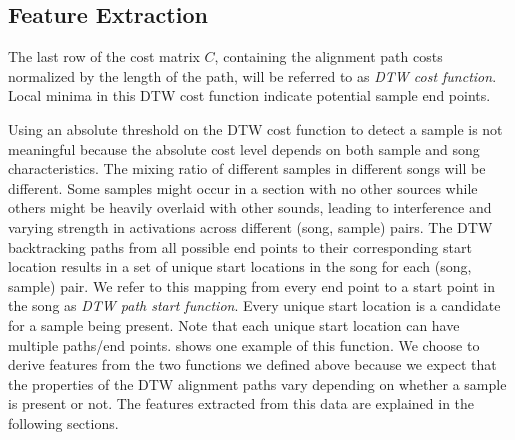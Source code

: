 \documentclass{article}
\begin{document}
\subsection{Feature Extraction}
The last row of the cost matrix $C$, containing the alignment path costs normalized by the length of the path, will be referred to as \textit{DTW cost function}. Local minima in this DTW cost function indicate potential sample end points.

Using an absolute threshold on the DTW cost function to detect a sample is not meaningful because the absolute cost level depends on both sample and song characteristics. The mixing ratio of different samples in different songs will be different. Some samples might occur in a section with no other sources while others might be heavily overlaid with other sounds, leading to interference and varying strength in activations across different (song, sample) pairs. The DTW backtracking paths from all possible end points to their corresponding start location results in a set of unique start locations in the song for each (song, sample) pair. We refer to this mapping from every end point to a start point in the song as \textit{DTW path start function}. Every unique start location is a candidate for a sample being present. Note that each unique start location can have multiple paths/end points.  shows one example of this function.
We choose to derive features from the two functions we defined above because we expect that the properties of the DTW alignment paths vary depending on whether a sample is present or not. The features extracted from this data are explained in the following sections. 

\end{document}
